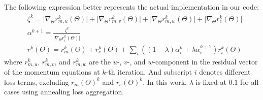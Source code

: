 The following expression better represents the actual implementation in our code:
\begin{equation}
    \begin{aligned}
        &\zeta^k =
            \overline{\lvert\nabla_\Theta r_{m,u}^k(\Theta)\rvert} +
            \overline{\lvert\nabla_\Theta r_{m,v}^k(\Theta)\rvert} +
            \overline{\lvert\nabla_\Theta r_{m,w}^k(\Theta)\rvert} +
            \overline{\lvert\nabla_\Theta r_{c}^k(\Theta)\rvert} \\
        &\alpha^{k+1} = 
            \frac{\zeta^k}{\overline{\lvert\nabla_\Theta r_i^k(\Theta)\rvert}} \\
        &r^k(\Theta) = r_m^k(\Theta) + r_c^k(\Theta) + 
            \sum\limits_{i} \left(\left(1-\lambda\right)\alpha_i^k + \lambda\alpha_i^{k+1}\right) r_i^k(\Theta)
    \end{aligned}
\end{equation}
where $r_{m,u}^k$, $r_{m,v}^k$, and $r_{m,w}^k$ are the $u$-, $v$-, and $w$-component in the residual vector of the momentum equations at $k$-th iteration.
And subscript $i$ denotes different loss terms, excluding $r_m(\Theta)^k$ and $r_c(\Theta)^k$.
In this work, $\lambda$ is fixed at $0.1$ for all cases using annealing loss aggregation.
